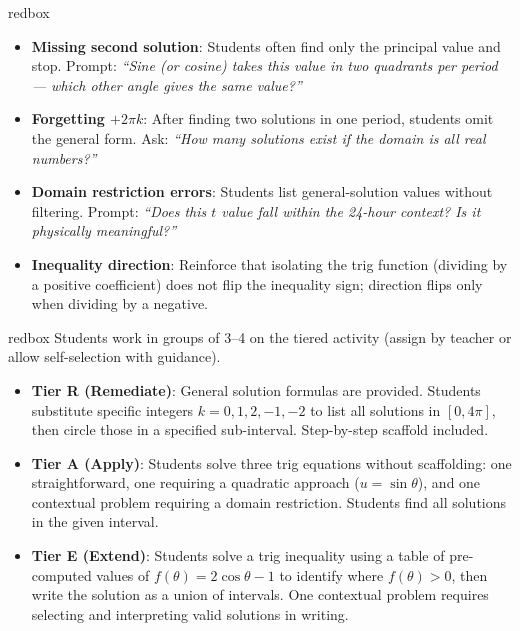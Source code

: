 \documentclass[10pt]{article}
\begin{document}
\begin{skillbox}{redbox}
\begin{itemize}[leftmargin=1.4em, itemsep=3pt]
  \item \textbf{Missing second solution}: Students often find only the principal
    value and stop. Prompt: \textit{``Sine (or cosine) takes this value in two
    quadrants per period --- which other angle gives the same value?''}
  \item \textbf{Forgetting $+2\pi k$}: After finding two solutions in one
    period, students omit the general form. Ask: \textit{``How many solutions
    exist if the domain is all real numbers?''}
  \item \textbf{Domain restriction errors}: Students list general-solution values
    without filtering. Prompt: \textit{``Does this $t$ value fall within the
    24-hour context? Is it physically meaningful?''}
  \item \textbf{Inequality direction}: Reinforce that isolating the trig function
    (dividing by a positive coefficient) does not flip the inequality sign;
    direction flips only when dividing by a negative.
\end{itemize}
\end{skillbox}

\vspace{0.08in}

\begin{skillbox}{redbox}
Students work in groups of 3--4 on the tiered activity (assign by teacher
or allow self-selection with guidance).

\begin{itemize}[leftmargin=1.4em, itemsep=4pt]
  \item \textbf{Tier R (Remediate)}: General solution formulas are provided.
    Students substitute specific integers $k = 0, 1, 2, -1, -2$ to list all
    solutions in $[0, 4\pi]$, then circle those in a specified sub-interval.
    Step-by-step scaffold included.
  \item \textbf{Tier A (Apply)}: Students solve three trig equations without
    scaffolding: one straightforward, one requiring a quadratic approach
    ($u = \sin\theta$), and one contextual problem requiring a domain
    restriction. Students find all solutions in the given interval.
  \item \textbf{Tier E (Extend)}: Students solve a trig inequality using a
    table of pre-computed values of $f(\theta) = 2\cos\theta - 1$ to identify
    where $f(\theta) > 0$, then write the solution as a union of intervals.
    One contextual problem requires selecting and interpreting valid solutions
    in writing.
\end{itemize}
\end{skillbox}
\end{document}
